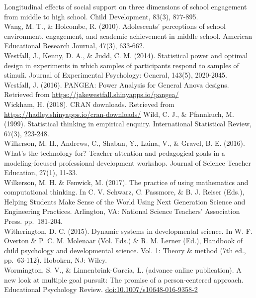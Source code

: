 \documentclass[]{msu-thesis}
\theoremstyle{definition}
\theoremstyle{definition}
\theoremstyle{definition}
\theoremstyle{remark}
\begin{document}
Longitudinal effects of social support on three dimensions of school
engagement from middle to high school. Child Development, 83(3),
877-895.\\
Wang, M. T., \& Holcombe, R. (2010). Adolescents' perceptions of school
environment, engagement, and academic achievement in middle school.
American Educational Research Journal, 47(3), 633-662.\\
Westfall, J., Kenny, D. A., \& Judd, C. M. (2014). Statistical power and
optimal design in experiments in which samples of participants respond
to samples of stimuli. Journal of Experimental Psychology: General,
143(5), 2020-2045.\\
Westfall, J. (2016). PANGEA: Power Analysis for General Anova designs.
Retrieved from \url{https://jakewestfall.shinyapps.io/pangea/}\\
Wickham, H. (2018). CRAN downloads. Retrieved from
\url{https://hadley.shinyapps.io/cran-downloads/} Wild, C. J., \&
Pfannkuch, M. (1999). Statistical thinking in empirical enquiry.
International Statistical Review, 67(3), 223-248.\\
Wilkerson, M. H., Andrews, C., Shaban, Y., Laina, V., \& Gravel, B. E.
(2016). What's the technology for? Teacher attention and pedagogical
goals in a modeling-focused professional development workshop. Journal
of Science Teacher Education, 27(1), 11-33.\\
Wilkerson, M. H. \& Fenwick, M. (2017). The practice of using
mathematics and computational thinking. In C. V. Schwarz, C. Passmore,
\& B. J. Reiser (Eds.), Helping Students Make Sense of the World Using
Next Generation Science and Engineering Practices. Arlington, VA:
National Science Teachers' Association Press. pp.~181-204.\\
Witherington, D. C. (2015). Dynamic systems in developmental science. In
W. F. Overton \& P. C. M. Molenaar (Vol. Eds.) \& R. M. Lerner (Ed.),
Handbook of child psychology and developmental science. Vol. 1: Theory
\& method (7th ed., pp.~63-112). Hoboken, NJ: Wiley.\\
Wormington, S. V., \& Linnenbrink-Garcia, L. (advance online
publication). A new look at multiple goal pursuit: The promise of a
person-centered approach. Educational Psychology Review.
\url{doi:10.1007/s10648-016-9358-2}


\end{document}
